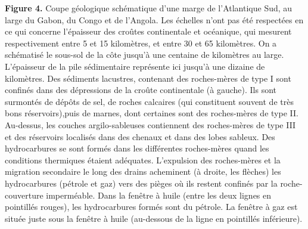 \documentclass[8pt]{article}
\begin{document}
\begin{tcolorbox}[colback=white]
	\begin{center}
	\end{center}
	\textbf{Figure 4.} Coupe géologique schématique d’une marge de l’Atlantique Sud, au large du Gabon,
	du Congo et de l’Angola. Les échelles n’ont pas été respectées en ce qui concerne l’épaisseur des croûtes continentale et océanique, qui mesurent respectivement entre 5 et 15 kilomètres, et entre 30 et 65 kilomètres. On a schématisé le sous-sol de la côte jusqu’à une centaine de kilomètres au large. L’épaisseur de la pile sédimentaire représente ici jusqu’à
	une dizaine de kilomètres. Des sédiments lacustres, contenant des roches-mères de type I sont confinés dans des dépressions de la croûte continentale (à gauche). Ils sont surmontés de dépôts de sel, de roches calcaires (qui constituent souvent de très bons réservoirs),puis de marnes, dont certaines sont des roches-mères de type II. Au-dessus, les couches argilo-sableuses contiennent des roches-mères de type III et des réservoirs localisés dans
	des chenaux et dans des lobes sableux. Des hydrocarbures se sont formés dans les différentes roches-mères quand les conditions thermiques étaient adéquates. L’expulsion des
	roches-mères et la migration secondaire le long des drains acheminent (à droite, les flèches) les hydrocarbures (pétrole et gaz) vers des pièges où ils restent confinés par la
	roche-couverture imperméable. Dans la fenêtre à huile (entre les deux lignes en pointillés
	rouges), les hydrocarbures formés sont du pétrole. La fenêtre à gaz est située juste sous la fenêtre à huile (au-dessous de la ligne en pointillés inférieure).
	
\end{tcolorbox}
\end{document}

